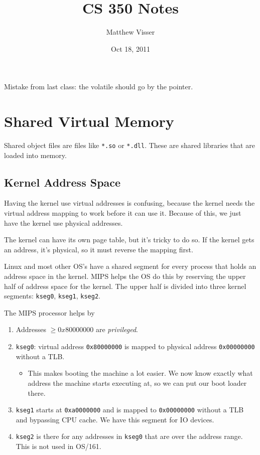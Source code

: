 \documentclass[12pt]{article}
\begin{document}
\title{CS 350 Notes}
\author{Matthew Visser}
\date{Oct 18, 2011}
\maketitle

Mistake from last class: the volatile should go by the pointer.

\section{Shared Virtual Memory}

Shared object files are files like \texttt{*.so} or \texttt{*.dll}. These are
shared libraries that are loaded into memory.

\subsection{Kernel Address Space}

Having the kernel use virtual addresses is confusing, because the kernel needs
the virtual address mapping to work before it can use it. Because of this, we
just have the kernel use physical addresses.

The kernel can have its own page table, but it's tricky to do so. If the kernel
gets an address, it's physical, so it must reverse the mapping first.

Linux and most other OS's have a shared segment for every process that holds an
address space in the kernel. MIPS helps the OS do this by reserving the upper
half of address space for the kernel. The upper half is divided into three
kernel segments: \texttt{kseg0}, \texttt{kseg1}, \texttt{kseg2}.

The MIPS processor helps by
\begin{enumerate}
	\item Addresses $\ge 0x80000000$ are \emph{privileged}.
	\item \texttt{kseg0}: virtual address \texttt{0x80000000} is mapped to
		physical address \texttt{0x00000000} without a TLB.
		\begin{itemize}
			\item This makes booting the machine a lot easier. We now know
				exactly what address the machine starts executing at, so we can
				put our boot loader there.
		\end{itemize}
	\item \texttt{kseg1} starts at \texttt{0xa0000000} and is mapped to
		\texttt{0x00000000} without a TLB and bypassing CPU cache. We have this
		segment for IO devices.
	\item \texttt{kseg2} is there for any addresses in \texttt{kseg0} that are
		over the address range. This is not used in OS/161.
\end{enumerate}
\end{document}

